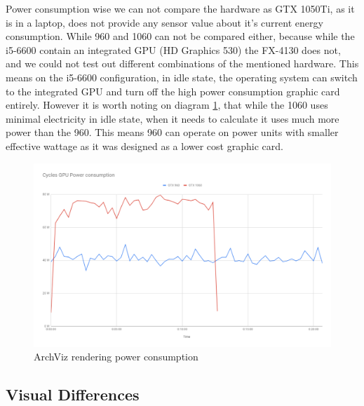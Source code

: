 \documentclass[conference]{IEEEtran}
\begin{document}
        Power consumption wise we can not compare the hardware as GTX 1050Ti, as it is in a laptop, does not provide any sensor value about it's current energy consumption. While 960 and 1060 can not be compared either, because while the i5-6600 contain an integrated GPU (HD Graphics 530) the FX-4130 does not, and we could not test out different combinations of the mentioned hardware. This means on the i5-6600 configuration, in idle state, the operating system can switch to the integrated GPU and turn off the high power consumption graphic card entirely. However it is worth noting on diagram \ref{cycles_pwr}, that while the 1060 uses minimal electricity in idle state, when it needs to calculate it uses much more power than the 960. This means 960 can operate on power units with smaller effective wattage as it was designed as a lower cost graphic card.
        \begin{figure}[htbp]
            \centering
            \includegraphics[scale=0.3]{Images/cycles_archviz_gpu_power_graph.png}
            \caption{ArchViz rendering power consumption}
            \label{cycles_pwr}
        \end{figure}

\subsection{Visual Differences}
\end{document}

